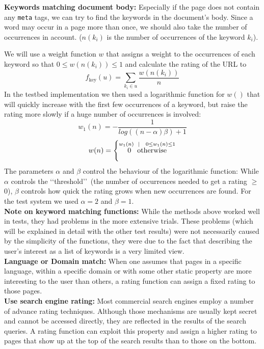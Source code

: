\documentclass[a4paper]{danarticle}
\theoremstyle{remark}
\begin{document}
    \textbf{Keywords matching document body:} Especially if the page does not
    contain any \verb$meta$ tags, we can try to find the keywords in the
    document's body. Since a word may occur in a page more than once, we should
    also take the number of occurrences in account. ($ n(k_i) $ is the number of
    occurrences of the keyword $ k_i $).
    
    We will use a weight function $ w $ that assigns a weight to the occurrences
    of each keyword so that $ 0 \leq w(n(k_i)) \leq 1 $ and calculate the
    rating of the URL to
    \[
      f_{\mbox{key}}(u) = \sum_{k_i \in u} \frac{w(n(k_i))}{n}
    \]
    In the testbed implementation we then used a logarithmic function for 
    $w()$ that will quickly increase with the first few occurrences of a 
    keyword, but raise the rating more slowly if a huge number of occurrences is 
    involved:
    \[
      w_1(n) = - \frac{1}{log((n - \alpha) \beta) + 1}
    \]
    \[
      w(n) = \left\{
      \stackrel{w_1(n) \hspace{2mm} | \hspace{3mm} 0 \leq w_1(n) \leq 1}
      {0 \hspace{3mm} \mbox{otherwise}}
      \right.
    \]
    The parameters $ \alpha $ and $ \beta $ control the behaviour of the
    logarithmic function: While $ \alpha $ controls the \lq\lq threshold\rq\rq\
    (the number of occurrences needed to get a rating $ \geq $ 0), $ \beta $
    controls how quick the rating grows when new occurrences are found. For the
    test system we used $ \alpha = 2 $ and $ \beta = 1 $.
    \\
    
    \textbf{Note on keyword matching functions:} While the methods above worked
    well in tests, they had problems in the more extensive trials. These
    problems (which will be explained in detail with the other test results)
    were not necessarily caused by the simplicity of the functions, they were
    due to the fact that describing the user's interest as a list of keywords is
    a very limited view.
    \\
    
    \textbf{Language or Domain match:} When one assumes that pages in a specific 
    language, within a specific domain or with some other static property are 
    more interesting to the user than others, a rating function can assign a 
    fixed rating to those pages.
    \\
    
    \textbf{Use search engine rating:} Most commercial search engines employ a 
    number of advance rating techniques. Although those mechanisms are 
    usually kept secret and cannot be accessed directly, they are reflected in 
    the results of the search queries. A rating function can exploit this property 
    and assign a higher rating to pages that show up at the top of the search 
    results than to those on the bottom.
\end{document}
